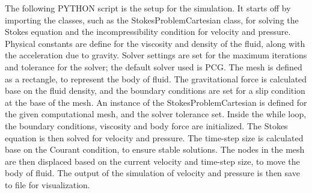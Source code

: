 The following PYTHON script is the setup for the simulation. It starts off by importing the classes, such as the StokesProblemCartesian class, for solving the Stokes equation and the incompressibility condition for velocity and pressure. Physical constants are define for the viscosity and density of the fluid, along with the acceleration due to gravity. Solver settings are set for the maximum iterations and tolerance for the solver; the default solver used is PCG. The mesh is defined as a rectangle, to represent the body of fluid. The gravitational force is calculated base on the fluid density, and the boundary conditions are set for a slip condition at the base of the mesh. An instance of the StokesProblemCartesian is defined for the given computational mesh, and the solver tolerance set. Inside the while loop, the boundary conditions, viscosity and body force are initialized. The Stokes equation is then solved for velocity and pressure. The time-step size is calculated base on the Courant condition, to ensure stable solutions. The nodes in the mesh are then displaced based on the current velocity and time-step size, to move the body of fluid. The output of the simulation of velocity and pressure is then save to file for visualization. 
%
